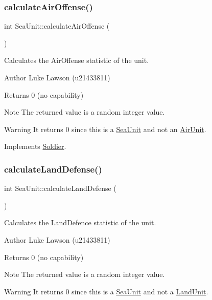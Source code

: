\subsubsection{\texorpdfstring{calculateAirOffense()}{calculateAirOffense()}}
{\footnotesize\ttfamily int Sea\+Unit\+::calculate\+Air\+Offense (\begin{DoxyParamCaption}{ }\end{DoxyParamCaption})\hspace{0.3cm}{\ttfamily [virtual]}}



Calculates the Air\+Offense statistic of the unit. 

\begin{DoxyAuthor}{Author}
Luke Lawson (u21433811) 
\end{DoxyAuthor}
\begin{DoxyReturn}{Returns}
0 (no capability) 
\end{DoxyReturn}
\begin{DoxyNote}{Note}
The returned value is a random integer value. 
\end{DoxyNote}
\begin{DoxyWarning}{Warning}
It returns 0 since this is a \mbox{\hyperlink{class_sea_unit}{Sea\+Unit}} and not an \mbox{\hyperlink{class_air_unit}{Air\+Unit}}. 
\end{DoxyWarning}


Implements \mbox{\hyperlink{class_soldier_ad5290f69e84772e9a3bfc060b5d348a0}{Soldier}}.

\mbox{\label{class_sea_unit_a5fa9cb7bedbe58346fcd22fdd7ca855b}} 
\subsubsection{\texorpdfstring{calculateLandDefense()}{calculateLandDefense()}}
{\footnotesize\ttfamily int Sea\+Unit\+::calculate\+Land\+Defense (\begin{DoxyParamCaption}{ }\end{DoxyParamCaption})\hspace{0.3cm}{\ttfamily [virtual]}}



Calculates the Land\+Defence statistic of the unit. 

\begin{DoxyAuthor}{Author}
Luke Lawson (u21433811) 
\end{DoxyAuthor}
\begin{DoxyReturn}{Returns}
0 (no capability) 
\end{DoxyReturn}
\begin{DoxyNote}{Note}
The returned value is a random integer value. 
\end{DoxyNote}
\begin{DoxyWarning}{Warning}
It returns 0 since this is a \mbox{\hyperlink{class_sea_unit}{Sea\+Unit}} and not a \mbox{\hyperlink{class_land_unit}{Land\+Unit}}. 
\end{DoxyWarning}



